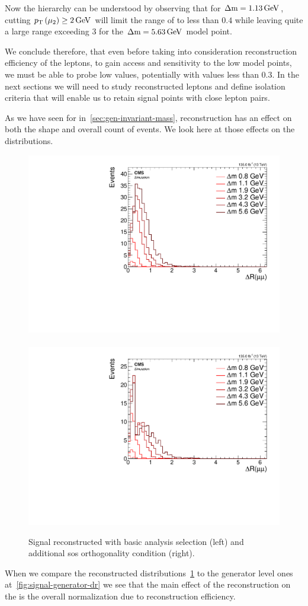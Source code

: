 Now the hierarchy can be understood by observing that for $\Delta\mathrm{m}=1.13\,\text{Ge\hspace{-.08em}V}$, cutting $p_{\mathrm{T}}\left(\mu_2\right)\geq 2\,\text{Ge\hspace{-.08em}V}$ will limit the range of \drmm to less than $0.4$ while leaving quite a large range exceeding 3 for the $\Delta\mathrm{m}=5.63\,\text{Ge\hspace{-.08em}V}$ model point.

We conclude therefore, that even before taking into consideration reconstruction efficiency of the leptons, to gain access and sensitivity to the low \dm model points, we must be able to probe low \drll values, potentially with values less than 0.3. In the next sections we will need to study reconstructed leptons and define isolation criteria that will enable us to retain signal points with close lepton pairs.

As we have seen for \mmumu in~\ref{sec:gen-invariant-mass}, reconstruction has an effect on both the shape and overall count of events. We look here at those effects on the \drmm distributions.

\begin{figure}[h]
\centering
\includegraphics[width=0.48\linewidth]{plots/signal_muons/none_deltaRCorrJetNoMultIso10Dr0.6.pdf} \,
\includegraphics[width=0.48\linewidth]{plots/signal_muons/none_deltaRCorrJetNoMultIso10Dr0.6_orth.pdf}  \\
\caption[Signal reconstructed \drmm]{ Signal reconstructed \drmm with basic analysis selection (left) and additional \gls{sos} orthogonality condition (right).}
\label{fig:reco-signal-dr}
\end{figure}

When we compare the reconstructed \drmm distributions~\ref{fig:reco-signal-dr} to the generator level ones at~\ref{fig:signal-generator-dr} we see that the main effect of the reconstruction on the \drmm is the overall normalization due to reconstruction efficiency.

